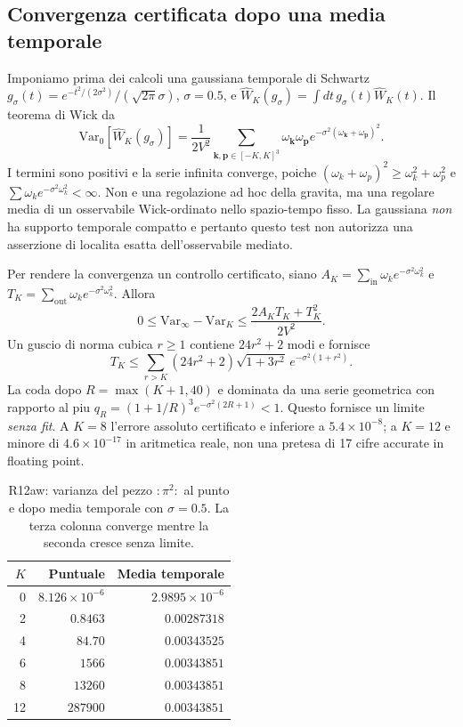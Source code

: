 \documentclass[11pt,a4paper]{article}
\begin{document}
\subsection{Convergenza certificata dopo una media temporale}
Imponiamo prima dei calcoli una gaussiana temporale di Schwartz $g_\sigma(t)=e^{-t^2/(2\sigma^2)}/(\sqrt{2\pi}\sigma)$, $\sigma=0.5$, e $\hat W_K(g_\sigma)=\int dt\,g_\sigma(t)\hat W_K(t)$. Il teorema di Wick da
\begin{equation}
 \boxed{\mathrm{Var}_0[\hat W_K(g_\sigma)]
 =\frac{1}{2V^2}\sum_{\mathbf k,\mathbf p\in[-K,K]^3}
 \omega_{\mathbf k}\omega_{\mathbf p}
 e^{-\sigma^2(\omega_{\mathbf k}+\omega_{\mathbf p})^2}.}
 \label{eq:r12aw-smeared-variance}
\end{equation}
I termini sono positivi e la serie infinita converge, poiche $(\omega_k+\omega_p)^2\ge\omega_k^2+\omega_p^2$ e $\sum\omega_k e^{-\sigma^2\omega_k^2}<\infty$. Non e una regolazione ad hoc della gravita, ma una regolare media di un osservabile Wick-ordinato nello spazio-tempo fisso. La gaussiana \emph{non} ha supporto temporale compatto e pertanto questo test non autorizza una asserzione di localita esatta dell'osservabile mediato.

Per rendere la convergenza un controllo certificato, siano $A_K=\sum_{\mathrm{in}}\omega_k e^{-\sigma^2\omega_k^2}$ e $T_K=\sum_{\mathrm{out}}\omega_k e^{-\sigma^2\omega_k^2}$. Allora
\begin{equation}
 0\le \mathrm{Var}_\infty-\mathrm{Var}_K
 \le\frac{2A_KT_K+T_K^2}{2V^2}.
 \label{eq:r12aw-tail-noise}
\end{equation}
Un guscio di norma cubica $r\ge1$ contiene $24r^2+2$ modi e fornisce
\begin{equation}
 T_K\le\sum_{r>K}(24r^2+2)\sqrt{1+3r^2}\,e^{-\sigma^2(1+r^2)}.
 \label{eq:r12aw-tail-shell}
\end{equation}
La coda dopo $R=\max(K+1,40)$ e dominata da una serie geometrica con rapporto al piu $q_R=(1+1/R)^3 e^{-\sigma^2(2R+1)}<1$. Questo fornisce un limite \emph{senza fit}. A $K=8$ l'errore assoluto certificato e inferiore a $5.4\times10^{-8}$; a $K=12$ e minore di $4.6\times10^{-17}$ in aritmetica reale, non una pretesa di 17 cifre accurate in floating point.

\begin{table}[htbp]\centering\small
\caption{R12aw: varianza del pezzo $:\!\pi^2\!:$ al punto e dopo media temporale con $\sigma=0.5$. La terza colonna converge mentre la seconda cresce senza limite.}
\begin{tabular}{rrr}\toprule
$K$ & Puntuale & Media temporale \\\midrule
0 & $8.126\times10^{-6}$ & $2.9895\times10^{-6}$ \\
2 & $0.8463$ & $0.00287318$ \\
4 & $84.70$ & $0.00343525$ \\
6 & $1566$ & $0.00343851$ \\
8 & $13260$ & $0.00343851$ \\
12 & $287900$ & $0.00343851$ \\
\bottomrule\end{tabular}
\label{tab:r12aw-noise}
\end{table}
\end{document}
